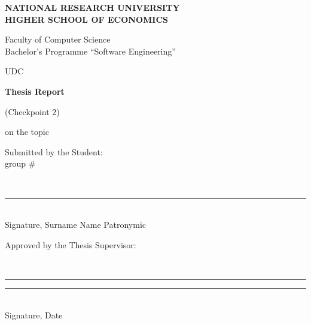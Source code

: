 %
\begin{titlepage}
\thispagestyle{empty}
\singlespacing
\footnotesize
\setlength{\parindent}{0pt}
\setlength{\parskip}{0pt}

\begin{center}
\textbf{NATIONAL RESEARCH UNIVERSITY}\\
\textbf{HIGHER SCHOOL OF ECONOMICS}

\vspace{0.35cm}
Faculty of Computer Science\\
Bachelor's Programme ``Software Engineering''
\end{center}

\vspace{0.3cm}
\noindent
UDC~\hseUDC

\vspace{1.6cm}
\begin{center}
\textbf{\normalsize Thesis Report}

\vspace{0.12cm}
(Checkpoint 2)

\vspace{0.45cm}
on the topic
\underline{\makebox[0.9\textwidth][c]{\hseProjectName}}
\end{center}

\vspace{1.4cm}
\noindent
\begin{minipage}[t]{0.5\textwidth}
\raggedright
Submitted by the Student:\\
group \#\hseGroup

\vspace{0.25cm}
\strut\hseAuthorName\\[-0.05cm]
\rule{6cm}{0.4pt}\\[-0.05cm]
{\scriptsize Signature, Surname Name Patronymic}
\end{minipage}

\vspace{0.9cm}
\noindent
\begin{minipage}[t]{0.7\textwidth}
\raggedright
Approved by the Thesis Supervisor:\\
\strut\hseSupervisorName\\
\strut\hseSupervisorTitle

\vspace{0.25cm}
\rule{3.6cm}{0.4pt}\quad\rule{2.2cm}{0.4pt}\\[-0.05cm]
{\scriptsize Signature, Date}
\end{minipage}

\vfill
\begin{center}
\textbf{\hseCityEn{} \hseYear}
\end{center}
\end{titlepage}
\clearpage
